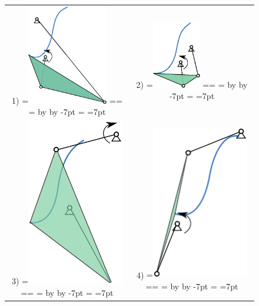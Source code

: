 \documentclass[twocolumn,10pt]{asme2e}
\makeatletter
\newcommand{\putindeepbox}[2][0.7\baselineskip]{{%
    \setbox0=\hbox{#2}%
    \setbox0=\vbox{\noindent\hsize=\wd0\unhbox0}
    \@tempdima=\dp0
    \advance\@tempdima by \ht0
    \advance\@tempdima by -#1\relax
    \dp0=\@tempdima
    \ht0=#1\relax
    \box0
}}
\makeatother
\begin{document}
\begin{figure}
\begin{tabular}{cc}
  1)\putindeepbox[7pt]{\includegraphics[width=100pt]{figure/path_solutions/path_sol1.eps}}
    & 2)\putindeepbox[7pt]{\includegraphics[width=60pt]{figure/path_solutions/path_sol2.eps}} \\
  3)\putindeepbox[7pt]{\includegraphics[width=120pt]{figure/path_solutions/path_sol3.eps}}
    & 4)\putindeepbox[7pt]{\includegraphics[width=120pt]{figure/path_solutions/path_sol4.eps}}\\

\end{tabular}
\end{figure}
\end{document}
